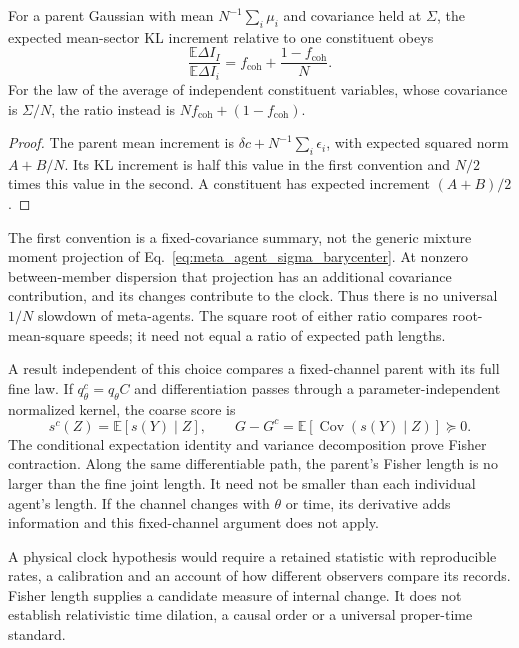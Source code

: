 \begin{proposition}\label{prop:meta_clock_slowdown}
For a parent Gaussian with mean $N^{-1}\sum_i\mu_i$ and covariance held at $\Sigma$, the expected mean-sector KL increment relative to one constituent obeys
\begin{equation}
\frac{\mathbb E\Delta I_I}{\mathbb E\Delta I_i}
=f_{\mathrm{coh}}+\frac{1-f_{\mathrm{coh}}}{N}.
\label{eq:bit_production_ratio}
\end{equation}
For the law of the average of independent constituent variables, whose covariance is $\Sigma/N$, the ratio instead is
$Nf_{\mathrm{coh}}+(1-f_{\mathrm{coh}})$.
\end{proposition}
\begin{proof}
The parent mean increment is $\delta c+N^{-1}\sum_i\epsilon_i$, with expected squared norm $A+B/N$. Its KL increment is half this value in the first convention and $N/2$ times this value in the second. A constituent has expected increment $(A+B)/2$.
\end{proof}
The first convention is a fixed-covariance summary, not the generic mixture moment projection of Eq.~\eqref{eq:meta_agent_sigma_barycenter}. At nonzero between-member dispersion that projection has an additional covariance contribution, and its changes contribute to the clock. Thus there is no universal $1/N$ slowdown of meta-agents. The square root of either ratio compares root-mean-square speeds; it need not equal a ratio of expected path lengths.

A result independent of this choice compares a fixed-channel parent with its full fine law. If $q_\theta^c=q_\theta C$ and differentiation passes through a parameter-independent normalized kernel, the coarse score is
\begin{equation}
s^c(Z)=\mathbb E[s(Y)\mid Z],\qquad
G-G^c=\mathbb E[\operatorname{Cov}(s(Y)\mid Z)]\succeq0.
\label{eq:clock_score_contraction}
\end{equation}
The conditional expectation identity and variance decomposition prove Fisher contraction. Along the same differentiable path, the parent's Fisher length is no larger than the fine joint length. It need not be smaller than each individual agent's length. If the channel changes with $\theta$ or time, its derivative adds information and this fixed-channel argument does not apply.

A physical clock hypothesis would require a retained statistic with reproducible rates, a calibration and an account of how different observers compare its records. Fisher length supplies a candidate measure of internal change. It does not establish relativistic time dilation, a causal order or a universal proper-time standard.

